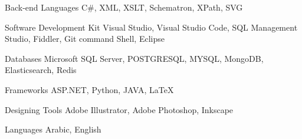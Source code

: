 

\begin{cvskills}

  \cvskill
    {Back-end Languages} %
    {C\#, XML, XSLT, Schematron, XPath, SVG} %

  \cvskill
    {Software Development Kit} %
    {Visual Studio, Visual Studio Code, SQL Management Studio, Fiddler, Git command Shell, Eclipse} %

  \cvskill
    {Databases} %
    {Microsoft SQL Server, POSTGRESQL, MYSQL, MongoDB, Elasticsearch, Redis} %

  \cvskill
    {Frameworks} %
    {ASP.NET, Python, JAVA, LaTeX} %

  \cvskill
  {Designing Tools} %
  {Adobe Illustrator, Adobe Photoshop, Inkscape} %

  \cvskill
    {Languages} %
    {Arabic, English} %

\end{cvskills}
